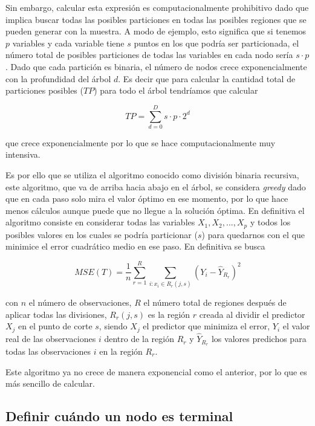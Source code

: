 Sin embargo, calcular esta expresión es computacionalmente prohibitivo dado que implica buscar todas las posibles particiones en todas las posibles regiones que se pueden generar con la muestra. A modo de ejemplo, esto significa que si tenemos $p$ variables y cada variable tiene $s$ puntos en los que podría ser particionada, el número total de posibles particiones de todas las variables en cada nodo sería $s \cdot p$. Dado que cada partición es binaria, el número de nodos crece exponencialmente con la profundidad del árbol $d$. Es decir que para calcular la cantidad total de particiones posibles ($TP$) para todo el árbol tendríamos que calcular 

\begin{equation}
    TP=\sum_{d=0}^{D}s \cdot p \cdot {2^{d}}
\end{equation}

que crece exponencialmente por lo que se hace computacionalmente muy intensiva.

Es por ello que se utiliza el algoritmo conocido como división binaria recursiva, este algoritmo, que va de arriba hacia abajo en el árbol, se considera \textit{greedy} dado que en cada paso solo mira el valor óptimo en ese momento, por lo que hace menos cálculos aunque puede que no llegue a la solución óptima.
En definitiva el algoritmo consiste en considerar todas las variables $X_1,X_2,...,X_p$ y todos los posibles valores en los cuales se podría particionar ($s$) para quedarnos con el que minimice el error cuadrático medio en ese paso. En definitiva se busca

\begin{equation}
MSE(T)=\frac{1}{n}\sum_{r=1}^{R}\sum_{i:x_i\in R_r(j,s)}(Y_i-\hat{Y}_{R_r})^2    
\end{equation}

con $n$ el número de observaciones, $R$ el número total de regiones después de aplicar todas las divisiones, $R_r(j,s)$ es la región $r$ creada al dividir el predictor $X_j$ en el punto de corte $s$, siendo $X_j$ el predictor que minimiza el error, $Y_i$ el valor real de las observaciones $i$ dentro de la región $R_r$ y $\hat{Y}_{R_r}$ los valores predichos para todas las observaciones $i$ en la región $R_r$.

Este algoritmo ya no crece de manera exponencial como el anterior, por lo que es más sencillo de calcular.

\subsection{Definir cuándo un nodo es terminal}

